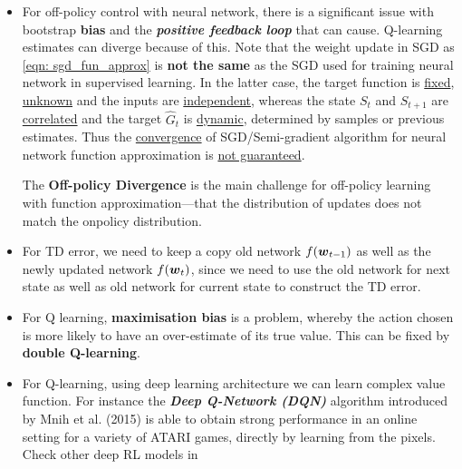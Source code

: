\documentclass[11pt]{article}
\begin{document}
\begin{itemize}
\item For off-policy control with neural network, there is a significant issue with bootstrap \textbf{bias} and the \emph{\textbf{positive feedback loop}} that can cause. Q-learning estimates can diverge because of this. Note that the weight update in SGD as \eqref{eqn: sgd_fun_approx} is \textbf{not the same} as the SGD used for training neural network in supervised learning. In the latter case, the target function is \underline{fixed}, \underline{unknown} and the inputs are \underline{independent}, whereas the state $S_{t}$ and $S_{t+1}$ are  \underline{correlated} and the target $\hat{G}_{t}$ is  \underline{dynamic}, determined by samples or previous estimates. Thus the  \underline{convergence} of SGD/Semi-gradient algorithm for neural network function approximation is  \underline{not guaranteed}. 

The \textbf{Off-policy Divergence} is the main challenge for off-policy learning with function approximation—that the distribution of updates does not match the onpolicy distribution.

\item For TD error, we need to keep a copy old network $f(\boldsymbol{w}_{t-1})$ as well as the newly updated network $f(\boldsymbol{w}_t)$, since we need to use the old network for next state as well as old network for current state to construct the TD error.

\item For Q learning, \textbf{maximisation bias} is a problem, whereby the action chosen is more likely to have an over-estimate of its true value. This can be fixed by \textbf{double Q-learning}.

\item For Q-learning, using deep learning architecture we can learn complex value function. For instance the \textbf{\emph{Deep Q-Network (DQN)}} \citep{franccois2018introduction}  algorithm introduced by Mnih et al. (2015) is able to obtain strong performance in an online setting for a variety of ATARI games, directly by learning from the pixels. Check other deep RL models in \citep{franccois2018introduction}
\end{itemize}
\end{document}
